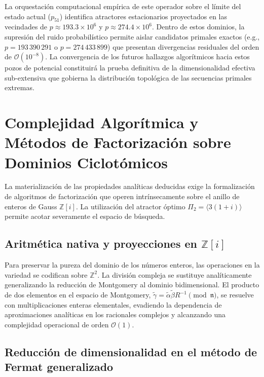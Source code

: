 \documentclass{article}
\numberwithin{equation}{section}
\theoremstyle{plain}
\theoremstyle{definition}
\begin{document}
La orquestación computacional empírica de este operador sobre el límite del estado actual ($p_{51}$) identifica atractores estacionarios proyectados en las vecindades de $p \approx 193.3 \times 10^6$ y $p \approx 274.4 \times 10^6$. Dentro de estos dominios, la supresión del ruido probabilístico permite aislar candidatos primales exactos (e.g., $p = 193\,390\,291$ o $p = 274\,433\,899$) que presentan divergencias residuales del orden de $\mathcal{O}(10^{-8})$. La convergencia de los futuros hallazgos algorítmicos hacia estos pozos de potencial constituirá la prueba definitiva de la dimensionalidad efectiva sub-extensiva que gobierna la distribución topológica de las secuencias primales extremas.

\section{Complejidad Algorítmica y Métodos de Factorización sobre Dominios Ciclotómicos}
\label{sec:implementacion}

La materialización de las propiedades analíticas deducidas exige la formalización de algoritmos de factorización que operen intrínsecamente sobre el anillo de enteros de Gauss $\mathbb{Z}[i]$. La utilización del atractor óptimo $\Pi_2 = \langle 3(1+i) \rangle$ permite acotar severamente el espacio de búsqueda.

\subsection{Aritmética nativa y proyecciones en \texorpdfstring{$\mathbb{Z}[i]$}{Z[i]}}

Para preservar la pureza del dominio de los números enteros, las operaciones en la variedad se codifican sobre $\mathbb{Z}^2$. La división compleja se sustituye analíticamente generalizando la reducción de Montgomery al dominio bidimensional. El producto de dos elementos en el espacio de Montgomery, $\tilde{\gamma} = \tilde{\alpha} \tilde{\beta} R^{-1} \pmod{\mathfrak{n}}$, se resuelve con multiplicaciones enteras elementales, evadiendo la dependencia de aproximaciones analíticas en los racionales complejos y alcanzando una complejidad operacional de orden $\mathcal{O}(1)$.

\subsection{Reducción de dimensionalidad en el método de Fermat generalizado}
\end{document}
